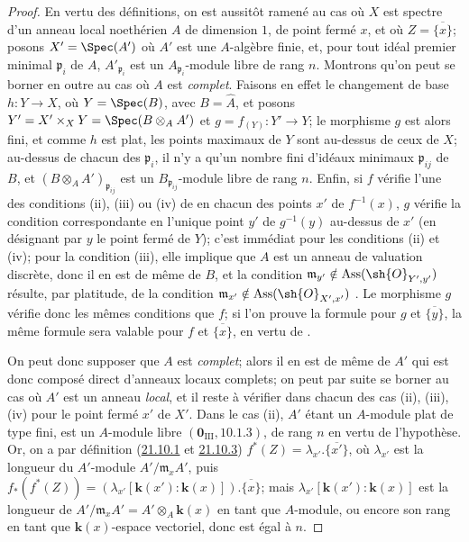 \begin{proof}
En vertu des définitions, on est aussitôt ramené au cas où $X$ est spectre d'un anneau local noethérien $A$ de dimension $1$, de point fermé $x$, et où $Z=\overline{\{x\}}$;
posons $X'=\Spec(A')$ où $A'$ est une $A$-algèbre finie, et, pour tout idéal premier minimal $\mathfrak{p}_i$ de $A$, $A'_{\mathfrak{p}_i}$ est un $A_{\mathfrak{p}_i}$-module libre de rang $n$.
Montrons qu'on peut se borner en outre au cas où $A$ est \emph{complet}.
Faisons en effet le changement de base $h:Y\to X$, où $Y=\Spec(B)$, avec $B=\widehat{A}$, et posons $Y'=X'\times_XY=\Spec(B\otimes_AA')$ et $g=f_{(Y)}:Y'\to Y$;
le morphisme $g$ est alors fini, et comme $h$ est plat, les points maximaux de $Y$ sont au-dessus de ceux de $X$;
au-dessus de chacun des $\mathfrak{p}_i$, il n'y a qu'un nombre fini d'idéaux minimaux $\mathfrak{p}_{ij}$ de $B$, et $(B\otimes_AA')_{\mathfrak{p}_{ij}}$ est un $B_{\mathfrak{p}_{ij}}$-module libre de rang $n$.
Enfin, si $f$ vérifie l'une des conditions (ii), (iii) ou (iv) de  en chacun des points $x'$ de $f^{-1}(x)$, $g$ vérifie la condition correspondante en l'unique point $y'$ de $g^{-1}(y)$ au-dessus de $x'$ (en désignant par $y$ le point fermé de $Y$);
c'est immédiat pour les conditions (ii) et (iv);
pour la condition (iii), elle implique que $A$ est un anneau de valuation discrète, donc il en est de même de $B$, et la condition
$\mathfrak{m}_{y'}\notin\operatorname{Ass}(\sh{O}_{Y',y'})$ résulte, par platitude, de la condition $\mathfrak{m}_{x'}\notin\operatorname{Ass}(\sh{O}_{X',x'})$ .
Le morphisme $g$ vérifie donc les mêmes conditions que $f$;
si l'on prouve la formule  pour $g$ et $\overline{\{y\}}$, la même formule sera valable pour $f$ et $\overline{\{x\}}$, en vertu de .

On peut donc supposer que $A$ est \emph{complet};
alors il en est de même de $A'$ qui est donc composé direct d'anneaux locaux complets;
on peut par suite se borner au cas où $A'$ est un anneau \emph{local}, et il reste à vérifier  dans chacun des cas (ii), (iii), (iv) pour le point fermé $x'$ de $X'$.
Dans le cas (ii), $A'$ étant un $A$-module plat de type fini, est un $A$-module libre $(\mathbf{0}_{\mathrm{III}},10.1.3)$, de rang $n$ en vertu de l'hypothèse.
Or, on a par définition (\hyperref[IV.21.10.1]{21.10.1} et \hyperref[IV.21.10.3]{21.10.3})
$f^*(Z)=\lambda_{x'}.\overline{\{x'\}}$, où $\lambda_{x'}$ est la longueur du $A'$-module $A'/\mathfrak{m}_xA'$, puis $f_*(f^*(Z))=(\lambda_{x'}[\boldsymbol{k}(x'): \boldsymbol{k}(x)]).\overline{\{x\}}$;
mais $\lambda_{x'}[\boldsymbol{k}(x'): \boldsymbol{k}(x)]$ est la longueur de $A'/\mathfrak{m}_xA'=A'\otimes_A\boldsymbol{k}(x)$ en tant que $A$-module, ou encore son rang en tant que $\boldsymbol{k}(x)$-espace vectoriel, donc est égal à $n$.


\end{proof}

